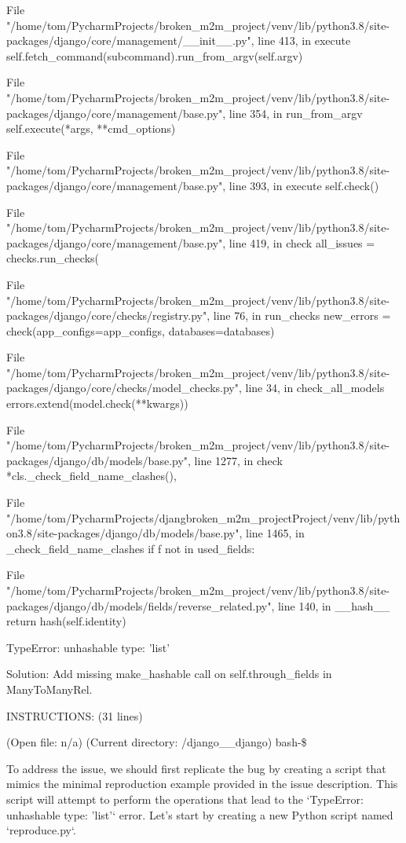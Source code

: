 {\begin{issuebox}
\begin{CodeVerbatim}[breaklines=true, breakanywhere=true]
 File "/home/tom/PycharmProjects/broken\_m2m\_project/venv/lib/python3.8/site-packages/django/core/management/\_\_init\_\_.py", line 413, in execute
	self.fetch\_command(subcommand).run\_from\_argv(self.argv)

 File "/home/tom/PycharmProjects/broken\_m2m\_project/venv/lib/python3.8/site-packages/django/core/management/base.py", line 354, in run\_from\_argv
	self.execute(*args, **cmd\_options)

 File "/home/tom/PycharmProjects/broken\_m2m\_project/venv/lib/python3.8/site-packages/django/core/management/base.py", line 393, in execute
	self.check()

 File "/home/tom/PycharmProjects/broken\_m2m\_project/venv/lib/python3.8/site-packages/django/core/management/base.py", line 419, in check
	all\_issues = checks.run\_checks(

 File "/home/tom/PycharmProjects/broken\_m2m\_project/venv/lib/python3.8/site-packages/django/core/checks/registry.py", line 76, in run\_checks
	new\_errors = check(app\_configs=app\_configs, databases=databases)

 File "/home/tom/PycharmProjects/broken\_m2m\_project/venv/lib/python3.8/site-packages/django/core/checks/model\_checks.py", line 34, in check\_all\_models
	errors.extend(model.check(**kwargs))

 File "/home/tom/PycharmProjects/broken\_m2m\_project/venv/lib/python3.8/site-packages/django/db/models/base.py", line 1277, in check
	*cls.\_check\_field\_name\_clashes(),

 File "/home/tom/PycharmProjects/djangbroken\_m2m\_projectProject/venv/lib/python3.8/site-packages/django/db/models/base.py", line 1465, in \_check\_field\_name\_clashes
	if f not in used\_fields:

 File "/home/tom/PycharmProjects/broken\_m2m\_project/venv/lib/python3.8/site-packages/django/db/models/fields/reverse\_related.py", line 140, in \_\_hash\_\_
	return hash(self.identity)

TypeError: unhashable type: 'list'
\end{CodeVerbatim}

Solution: Add missing make\_hashable call on self.through\_fields in ManyToManyRel.


INSTRUCTIONS: (31 lines)

\begin{CodeVerbatim}[breaklines=true, breakanywhere=true]
(Open file: n/a)
(Current directory: /django__django)
bash-\$
\end{CodeVerbatim}
\end{issuebox}
\begin{agentbox}
To address the issue, we should first replicate the bug by creating a script that mimics the minimal reproduction example provided in the issue description. This script will attempt to perform the operations that lead to the `TypeError: unhashable type: 'list'` error. Let's start by creating a new Python script named `reproduce.py`.




\end{agentbox}}
